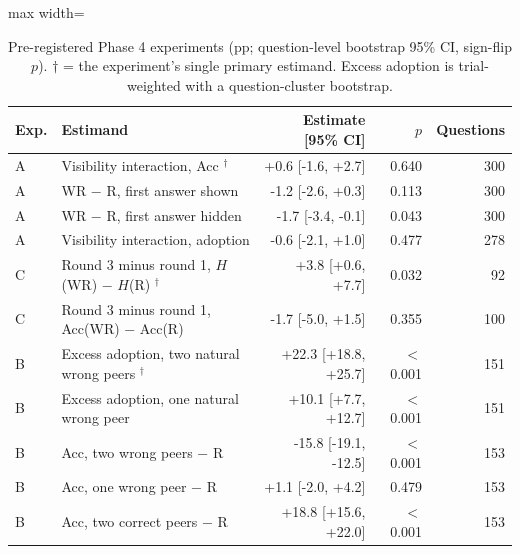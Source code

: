 \begin{table}[t]
\centering
\caption{Pre-registered Phase 4 experiments (pp; question-level bootstrap 95\% CI, sign-flip $p$). $\dagger$ = the experiment's single primary estimand. Excess adoption is trial-weighted with a question-cluster bootstrap.}
\label{tab:phase4}
\begin{adjustbox}{max width=\textwidth}
\small
\begin{tabular}{@{}llrrr@{}}
\toprule
Exp. & Estimand & Estimate [95\% CI] & $p$ & Questions \\
\midrule
A & Visibility interaction, Acc $^{\dagger}$ & +0.6 [-1.6, +2.7] & 0.640 & 300 \\
A & WR $-$ R, first answer shown & -1.2 [-2.6, +0.3] & 0.113 & 300 \\
A & WR $-$ R, first answer hidden & -1.7 [-3.4, -0.1] & 0.043 & 300 \\
A & Visibility interaction, adoption & -0.6 [-2.1, +1.0] & 0.477 & 278 \\
\midrule
C & Round 3 minus round 1, $H$(WR) $-$ $H$(R) $^{\dagger}$ & +3.8 [+0.6, +7.7] & 0.032 & 92 \\
C & Round 3 minus round 1, Acc(WR) $-$ Acc(R) & -1.7 [-5.0, +1.5] & 0.355 & 100 \\
\midrule
B & Excess adoption, two natural wrong peers $^{\dagger}$ & +22.3 [+18.8, +25.7] & $<$0.001 & 151 \\
B & Excess adoption, one natural wrong peer & +10.1 [+7.7, +12.7] & $<$0.001 & 151 \\
B & Acc, two wrong peers $-$ R & -15.8 [-19.1, -12.5] & $<$0.001 & 153 \\
B & Acc, one wrong peer $-$ R & +1.1 [-2.0, +4.2] & 0.479 & 153 \\
B & Acc, two correct peers $-$ R & +18.8 [+15.6, +22.0] & $<$0.001 & 153 \\
\bottomrule
\end{tabular}
\end{adjustbox}
\end{table}
